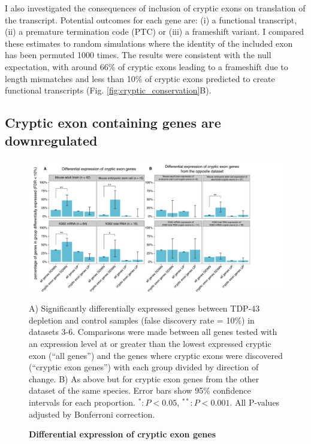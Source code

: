 I also investigated the consequences of inclusion of cryptic exons on translation of the transcript. Potential outcomes for each gene are: (i) a functional transcript, (ii) a premature termination code (PTC) or (iii) a frameshift variant. I compared these estimates to random simulations where the identity of the included exon has been permuted 1000 times. The results were consistent with the null expectation, with around 66\% of cryptic exons leading to a frameshift due to length mismatches and less than 10\% of cryptic exons predicted to create functional transcripts (Fig. \ref{fig:cryptic_conservation}B).


\subsection{Cryptic exon containing genes are downregulated}

\begin{figure}[h!]
	\centering
	\includegraphics[width=\textwidth]{Figures/03_cryptic_exons/Figure_5_Gene_Expression.png}
	\caption{\textbf{Differential expression of cryptic exon genes}}
	A) Significantly differentially expressed genes between TDP-43 depletion and control samples (false discovery rate = 10\%) in datasets 3-6. Comparisons were made between all genes tested with an expression level at or greater than the lowest expressed cryptic exon (``all genes'') and the genes where cryptic exons were discovered (``cryptic exon genes'') with each group divided by direction of change. B) As above but for cryptic exon genes from the other dataset of the same species. Error bars show 95\% confidence intervals for each proportion. $^* : P < 0.05$, $^{**} : P < 0.001$. All P-values adjusted by Bonferroni correction.
	\label{fig:cryptic_expression}
\end{figure}

